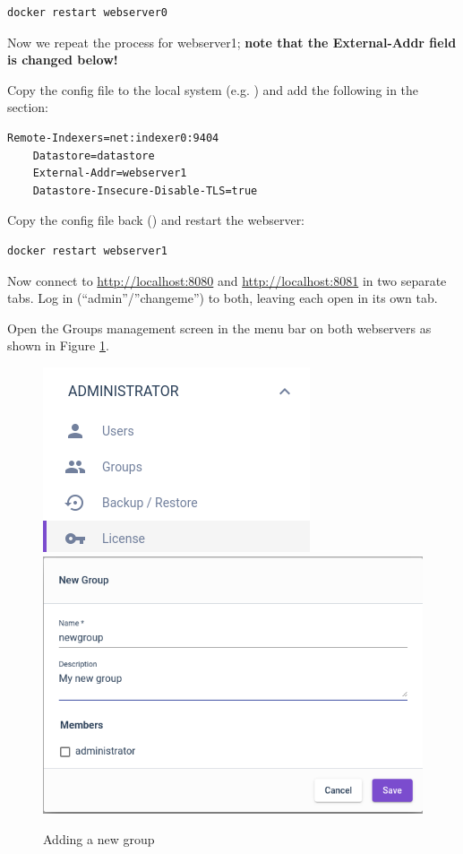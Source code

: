 \begin{Verbatim}[breaklines=true]
docker restart webserver0
\end{Verbatim}

Now we repeat the process for webserver1; \textbf{note that the External-Addr field is changed below!}

Copy the config file to the local system
(e.g. )
and add the following in the \code{[Global]} section:

\begin{Verbatim}[breaklines=true]
    Remote-Indexers=net:indexer0:9404
    Datastore=datastore
    External-Addr=webserver1
    Datastore-Insecure-Disable-TLS=true
\end{Verbatim}

Copy the config file back ()
and restart the webserver:

\begin{Verbatim}[breaklines=true]
docker restart webserver1
\end{Verbatim}

Now connect to
\href{http://localhost:8080}{http://localhost:8080} and
\href{http://localhost:8081}{http://localhost:8081} in two separate tabs.
Log in (``admin''/''changeme'') to both,
leaving each open in its own tab.

Open the Groups management screen in the menu bar on both webservers as shown in Figure \ref{fig:webserver-lab-newgroup}.

\begin{figure}
\includegraphics[width=0.4\linewidth]{images/groups-menu.png}\includegraphics[width=0.5\linewidth]{images/groups-new.png}
\caption{Adding a new group}
\label{fig:webserver-lab-newgroup}
\end{figure}

